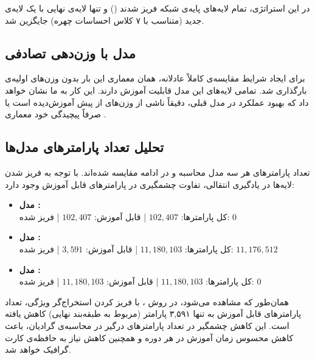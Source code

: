 در این استراتژی، تمام لایه‌های پایه‌ی شبکه  فریز شدند () و تنها لایه‌ی  نهایی با یک لایه‌ی جدید (متناسب با ۷ کلاس احساسات چهره) جایگزین شد.

\subsection{مدل  با وزن‌دهی تصادفی }
برای ایجاد شرایط مقایسه‌ی کاملاً عادلانه، همان معماری  این بار بدون وزن‌های اولیه‌ی  بارگذاری شد. تمامی لایه‌های این مدل قابلیت آموزش دارند. این کار به ما نشان خواهد داد که بهبود عملکرد در مدل قبلی، دقیقاً ناشی از وزن‌های از پیش‌ آموزش‌دیده است یا صرفاً پیچیدگی خود معماری .

\subsection{تحلیل تعداد پارامترهای مدل‌ها}
تعداد پارامترهای هر سه مدل محاسبه و در ادامه مقایسه شده‌اند. با توجه به فریز شدن لایه‌ها در یادگیری انتقالی، تفاوت چشمگیری در پارامترهای قابل آموزش وجود دارد:

\begin{itemize}
    \item \textbf{مدل :} \\ 
    کل پارامترها: $102,407$ | قابل آموزش: $102,407$ | فریز شده: $0$
    
    \item \textbf{مدل :} \\ 
    کل پارامترها: $11,180,103$ | قابل آموزش: $3,591$ | فریز شده: $11,176,512$
    
    \item \textbf{مدل :} \\ 
    کل پارامترها: $11,180,103$ | قابل آموزش: $11,180,103$ | فریز شده: $0$
\end{itemize}

همان‌طور که مشاهده می‌شود، در روش ، با فریز کردن استخراج‌گر ویژگی، تعداد پارامترهای قابل آموزش به تنها ۳,۵۹۱ پارامتر (مربوط به طبقه‌بند نهایی) کاهش یافته است. این کاهش چشمگیر در تعداد پارامترهای درگیر در محاسبه‌ی گرادیان، باعث کاهش محسوس زمان آموزش در هر دوره  و همچنین کاهش نیاز به حافظه‌ی کارت گرافیک  خواهد شد.